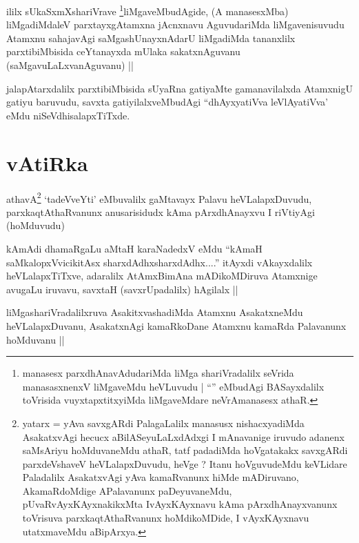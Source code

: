 \begin{artha}
ililx sUkaSxmXshariVrave \footnote{manasesx parxdhAnavAdudariMda liMga
  shariVradalilx seVrida manasasxnenxV liMgaveMdu heVLuvudu |
  ``\stext'' eMbudAgi BASayxdalilx toVrisida vuyxtapxtitxyiMda
  liMgaveMdare neVrAmanasesx athaR.}liMgaveMbudAgide, (A manasesxMba)
liMgadiMdaleV parxtayxgAtamxna jAcnxnavu AguvudariMda liMgavenisuvudu
Atamxnu sahajavAgi saMgashUnayxnAdarU liMgadiMda tananxlilx
parxtibiMbisida ceYtanayxda mUlaka sakatxnAguvanu
(saMgavuLaLxvanAguvanu) ||
\end{artha}


\begin{artha}
jalapAtarxdalilx parxtibiMbisida sUyaRna gatiyaMte gamanavilalxda
AtamxnigU gatiyu baruvudu, savxta gatiyilalxveMbudAgi ``dhAyxyatiVva
leVlAyatiVva' eMdu niSeVdhisalapxTiTxde.
\end{artha}

\section*{vAtiRka}


\begin{artha}
athavA\footnote{yatarx = yAva savxgARdi PalagaLalilx manasusx
  nishacxyadiMda AsakatxvAgi hecucx aBilASeyuLaLxdAdxgi I mAnavanige
  iruvudo adanenx saMsAriyu hoMduvaneMdu athaR, tatf padadiMda
  hoVgatakakx savxgARdi parxdeVshaveV heVLalapxDuvudu, heVge ? Itanu
  hoVguvudeMdu keVLidare Paladalilx AsakatxvAgi yAva kamaRvanunx hiMde
  mADiruvano, AkamaRdoMdige APalavanunx paDeyuvaneMdu,
  pUvaRvAyxKAyxnakikxMta IvAyxKAyxnavu kAma pArxdhAnayxvanunx
  toVrisuva parxkaqtAthaRvanunx hoMdikoMDide, I vAyxKAyxnavu
  utatxmaveMdu aBipArxya.} `tadeVveYti' eMbuvalilx gaMtavayx Palavu
heVLalapxDuvudu, parxkaqtAthaRvanunx anusarisidudx kAma pArxdhAnayxvu
I riVtiyAgi (hoMduvudu)
\end{artha}

\begin{artha}
kAmAdi dhamaRgaLu aMtaH karaNadedxV eMdu ``kAmaH saMkalopxVvicikitAsx
sharxdAdhx\s sharxdAdhx....'' itAyxdi vAkayxdalilx heVLalapxTiTxve,
adaralilx AtAmxBimAna mADikoMDiruva Atamxnige avugaLu iruvavu, savxtaH
(savxrUpadalilx) hAgilalx ||
\end{artha}

\begin{artha}
liMgashariVradalilxruva AsakitxvashadiMda Atamxnu AsakatxneMdu
heVLalapxDuvanu, AsakatxnAgi kamaRkoDane Atamxnu kamaRda Palavanunx
hoMduvanu ||
\end{artha}

